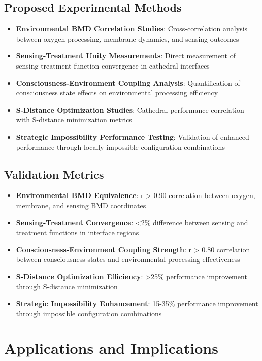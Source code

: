 \documentclass[12pt,a4paper]{article}
\begin{document}
\subsection{Proposed Experimental Methods}

\begin{itemize}
\item \textbf{Environmental BMD Correlation Studies}: Cross-correlation analysis between oxygen processing, membrane dynamics, and sensing outcomes
\item \textbf{Sensing-Treatment Unity Measurements}: Direct measurement of sensing-treatment function convergence in cathedral interfaces
\item \textbf{Consciousness-Environment Coupling Analysis}: Quantification of consciousness state effects on environmental processing efficiency
\item \textbf{S-Distance Optimization Studies}: Cathedral performance correlation with S-distance minimization metrics
\item \textbf{Strategic Impossibility Performance Testing}: Validation of enhanced performance through locally impossible configuration combinations
\end{itemize}

\subsection{Validation Metrics}

\begin{itemize}
\item \textbf{Environmental BMD Equivalence}: r > 0.90 correlation between oxygen, membrane, and sensing BMD coordinates
\item \textbf{Sensing-Treatment Convergence}: <2\% difference between sensing and treatment functions in interface regions
\item \textbf{Consciousness-Environment Coupling Strength}: r > 0.80 correlation between consciousness states and environmental processing effectiveness
\item \textbf{S-Distance Optimization Efficiency}: >25\% performance improvement through S-distance minimization
\item \textbf{Strategic Impossibility Enhancement}: 15-35\% performance improvement through impossible configuration combinations
\end{itemize}

\section{Applications and Implications}
\end{document}
